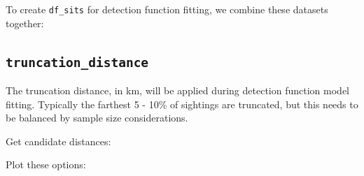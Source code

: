 \documentclass[
]{book}
\newenvironment{Shaded}{\begin{snugshade}}{\end{snugshade}}
\newcommand{\DataTypeTok}[1]{\textcolor[rgb]{0.13,0.29,0.53}{#1}}
\newcommand{\DecValTok}[1]{\textcolor[rgb]{0.00,0.00,0.81}{#1}}
\newcommand{\FloatTok}[1]{\textcolor[rgb]{0.00,0.00,0.81}{#1}}
\newcommand{\KeywordTok}[1]{\textcolor[rgb]{0.13,0.29,0.53}{\textbf{#1}}}
\newcommand{\NormalTok}[1]{#1}
\newcommand{\OperatorTok}[1]{\textcolor[rgb]{0.81,0.36,0.00}{\textbf{#1}}}
\newcommand{\StringTok}[1]{\textcolor[rgb]{0.31,0.60,0.02}{#1}}
\begin{document}
To create \texttt{df\_sits} for detection function fitting, we combine these datasets together:

\begin{Shaded}
\end{Shaded}

\hypertarget{truncation_distance}{%
\subsection*{\texorpdfstring{\texttt{truncation\_distance}}{truncation\_distance}}\label{truncation_distance}}

The truncation distance, in km, will be applied during detection function model fitting. Typically the farthest 5 - 10\% of sightings are truncated, but this needs to be balanced by sample size considerations.

Get candidate distances:

\begin{Shaded}
\end{Shaded}

Plot these options:

\begin{Shaded}
\end{Shaded}
\end{document}
